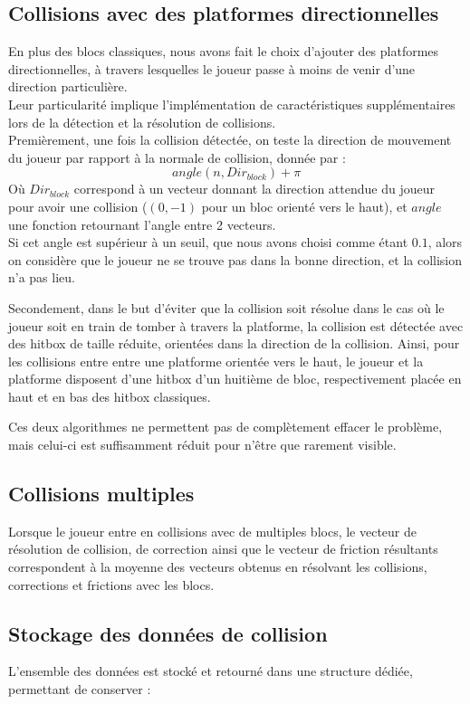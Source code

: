 \documentclass[10pt]{report}
\begin{document}
\subsection{Collisions avec des platformes directionnelles} \label{physique:direction}
En plus des blocs classiques, nous avons fait le choix d'ajouter des platformes directionnelles,
à travers lesquelles le joueur passe à moins de venir d'une direction particulière.\\
Leur particularité implique l'implémentation de caractéristiques supplémentaires
lors de la détection et la résolution de collisions.\\
Premièrement, une fois la collision détectée, on teste la direction de mouvement du joueur par rapport
à la normale de collision, donnée par :
\[
  angle(n,Dir_{block}) + \pi
\]
Où \(Dir_{block}\) correspond à un vecteur donnant la direction attendue du joueur pour avoir une collision
(\((0,-1)\) pour un bloc orienté vers le haut), et \(angle\) une fonction retournant l'angle entre 2 vecteurs.\\
Si cet angle est supérieur à un seuil, que nous avons choisi comme étant \(0.1\),
alors on considère que le joueur ne se trouve pas dans la bonne direction, et la collision n'a pas lieu.\par
Secondement, dans le but d'éviter que la collision soit résolue dans le cas où le joueur soit en train de
tomber à travers la platforme, la collision est détectée avec des hitbox de taille réduite,
orientées dans la direction de la collision.
Ainsi, pour les collisions entre entre une platforme orientée vers le haut, le joueur et la platforme disposent
d'une hitbox d'un huitième de bloc, respectivement placée en haut et en bas des hitbox classiques.\par
Ces deux algorithmes ne permettent pas de complètement effacer le problème, mais celui-ci est suffisamment
réduit pour n'être que rarement visible.

\subsection{Collisions multiples}
Lorsque le joueur entre en collisions avec de multiples blocs, le vecteur de résolution de collision,
de correction ainsi que le vecteur de friction résultants correspondent à la moyenne des vecteurs obtenus en
résolvant les collisions, corrections et frictions avec les blocs.

\subsection{Stockage des données de collision}
L'ensemble des données est stocké et retourné dans une structure dédiée, permettant de conserver :
\end{document}
